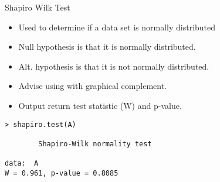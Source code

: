 \documentclass[pdf,default,slideColor,colorBG]{prosper}
\begin{document}
\begin{slide}{Shapiro Wilk Test }
\begin{itemize}
\item Used to determine if a data set is normally distributed
\item Null hypothesis is that it is normally distributed.
\item Alt. hypothesis is that it is not normally distributed.
\item Advise using with graphical complement.
\item Output return test statistic (W) and p-value.
\end{itemize}
\begin{verbatim}
> shapiro.test(A)

        Shapiro-Wilk normality test

data:  A
W = 0.961, p-value = 0.8085
\end{verbatim}
\end{slide}
\end{document}
